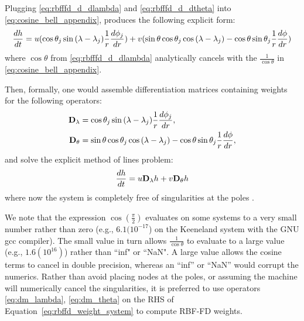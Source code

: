 \documentclass{report}
\begin{document}
Plugging \ref{eq:rbfffd_d_dlambda} and \ref{eq:rbfffd_d_dtheta} into \ref{eq:cosine_bell_appendix}, produces the following explicit form: 
\begin{align*}
\frac{d h}{d t} = u(\cos{\theta_j}\sin{(\lambda - \lambda_j)} \frac{1}{r} \frac{d \phi_j}{d r}) + v (\sin{\theta}\cos{\theta_j}\cos{(\lambda-\lambda_j)} - \cos{\theta}\sin{\theta_j} \frac{1}{r} \frac{d \phi}{d r}) 
\end{align*}
where $\cos{\theta}$ from \ref{eq:rbfffd_d_dlambda} analytically cancels with the $\frac{1}{\cos{\theta}}$ in \ref{eq:cosine_bell_appendix}.


Then, formally, one would assemble differentiation matrices containing weights for the following operators: 
\begin{align}
\mathbf{D}_\lambda & = \cos{\theta_j}\sin{(\lambda - \lambda_j)} \frac{1}{r} \frac{d \phi_j}{d r}, \label{eq:dm_lambda} \\
\mathbf{D}_\theta &=  \sin{\theta}\cos{\theta_j}\cos{(\lambda-\lambda_j)} - \cos{\theta}\sin{\theta_j} \frac{1}{r} \frac{d \phi}{d r}, \label{eq:dm_theta}
\end{align} 
and solve the explicit method of lines problem:
$$
\frac{d h}{d t} = u \mathbf{D}_\lambda h + v \mathbf{D}_\theta h
$$
where now the system is completely free of singularities at the poles \cite{FlyerWright09}. 

We note that the expression $\cos{(\frac{\pi}{2})}$ evaluates on some systems to a very small number rather than zero (e.g., $6.1(10^{-17}$) on the Keeneland system with the GNU gcc compiler). The small value in turn allows $\frac{1}{\cos{\theta}}$ to evaluate to a large value (e.g., $1.6(10^{16})$) rather than ``inf" or ``NaN". A large value allows the cosine terms to cancel in double precision, whereas an ``inf'' or ``NaN'' would corrupt the numerics. Rather than avoid placing nodes at the poles, or assuming the machine will numerically cancel the singularities, it is preferred to use operators \ref{eq:dm_lambda}, \ref{eq:dm_theta} on the RHS of Equation~\ref{eq:rbffd_weight_system} to compute RBF-FD weights. 



\ifstandalone


\end{document}
